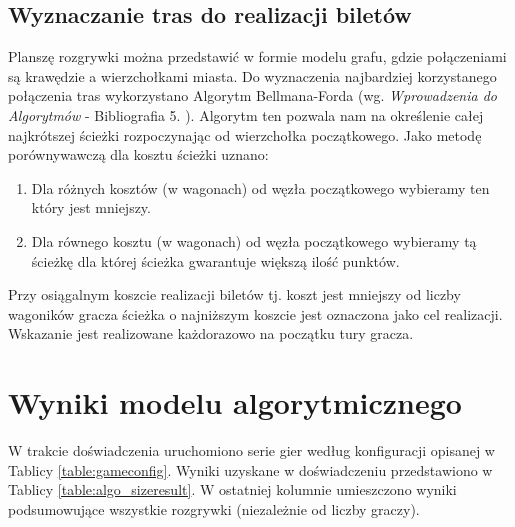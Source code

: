 \documentclass[12pt, oneside]{report}
\begin{document}
	\subsection{Wyznaczanie tras do realizacji biletów}
	Planszę rozgrywki można przedstawić w formie modelu grafu, gdzie połączeniami są krawędzie a wierzchołkami miasta. Do wyznaczenia najbardziej korzystanego połączenia tras wykorzystano Algorytm Bellmana-Forda (wg. \textit{Wprowadzenia do Algorytmów} - Bibliografia 5. ). Algorytm ten pozwala nam na określenie całej najkrótszej ścieżki rozpoczynając od wierzchołka początkowego. Jako metodę porównywawczą dla kosztu ścieżki uznano:
	\begin{enumerate}
		\item Dla różnych kosztów (w wagonach) od węzła początkowego wybieramy ten który jest mniejszy.
		\item Dla równego kosztu (w wagonach) od węzła początkowego wybieramy tą ścieżkę dla której ścieżka gwarantuje większą ilość punktów.
	\end{enumerate}
	Przy osiągalnym koszcie realizacji biletów tj. koszt jest mniejszy od liczby wagoników gracza ścieżka o najniższym koszcie jest oznaczona jako cel realizacji. Wskazanie jest realizowane każdorazowo na początku tury gracza.
	\section{Wyniki modelu algorytmicznego}
	W trakcie doświadczenia uruchomiono serie gier według konfiguracji opisanej w Tablicy \ref{table:gameconfig}. Wyniki uzyskane w doświadczeniu przedstawiono w Tablicy \ref{table:algo_sizeresult}. W ostatniej kolumnie umieszczono wyniki podsumowujące wszystkie rozgrywki (niezależnie od liczby graczy).
	
\end{document}
